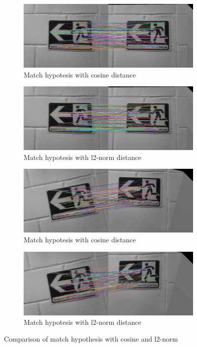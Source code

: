 \begin{figure}[!h]
	\centering
	\begin{subfigure}{0.5\textwidth}
	  \centering
	  \includegraphics[width=0.9\linewidth]{figs/affine_100_cosine_30_8_False_p2-1-1_6-7.jpg}
	  \caption{Match hypotesis with cosine distance}
	\end{subfigure}%
	\begin{subfigure}{0.5\textwidth}
	  \centering
	  \includegraphics[width=0.9\linewidth]{figs/affine_200_l2-norm_30_8_False_p2-1-1_6-7.jpg}
	  \caption{Match hypotesis with l2-norm distance}
	\end{subfigure}
	\begin{subfigure}{0.5\textwidth}
        \centering
        \includegraphics[width=0.9\linewidth]{figs/affine_100_cosine_30_8_False_p2-1-1_139-140.jpg}
        \caption{Match hypotesis with cosine distance}
      \end{subfigure}%
      \begin{subfigure}{0.5\textwidth}
        \centering
        \includegraphics[width=0.9\linewidth]{figs/affine_200_l2-norm_30_8_False_p2-1-1_139-140.jpg}
        \caption{Match hypotesis with l2-norm distance}
      \end{subfigure}%
       \caption{Comparison of match hypothesis with cosine and l2-norm}
	\label{fig:diff-l2-cosine}
\end{figure}

